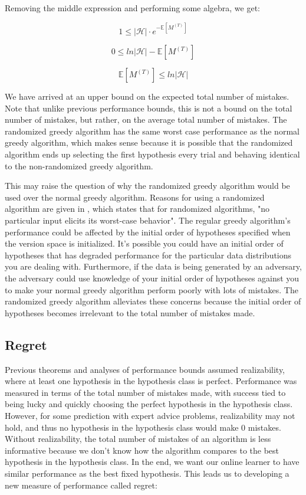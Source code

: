 \documentclass[11pt]{article}
\begin{document}
Removing the middle expression and performing some algebra, we get:

$$1 \leq |\mathcal{H}| \cdot e^{-\mathbb{E} [M^{(T)}]}$$

$$0 \leq ln |\mathcal{H}| -\mathbb{E} [M^{(T)}]$$

$$\mathbb{E} [M^{(T)}] \leq ln |\mathcal{H}|$$

We have arrived at an upper bound on the expected total number of mistakes. Note that unlike previous performance bounds, this is not a bound on the total number of mistakes, but rather, on the average total number of mistakes. The randomized greedy algorithm has the same worst case performance as the normal greedy algorithm, which makes sense because it is possible that the randomized algorithm ends up selecting the first hypothesis every trial and behaving identical to the non-randomized greedy algorithm. 

This may raise the question of why the randomized greedy algorithm would be used over the normal greedy algorithm. Reasons for using a randomized algorithm are given in \cite{cormen2009introduction}, which states that for randomized algorithms, "no particular input elicits its worst-case behavior". The regular greedy algorithm's performance could be affected by the initial order of hypotheses specified when the version space is initialized. It's possible you could have an initial order of hypotheses that has degraded performance for the particular data distributions you are dealing with. Furthermore, if the data is being generated by an adversary, the adversary could use knowledge of your initial order of hypotheses against you to make your normal greedy algorithm perform poorly with lots of mistakes. The randomized greedy algorithm alleviates these concerns because the initial order of hypotheses becomes irrelevant to the total number of mistakes made.

\subsection{Regret}

Previous theorems and analyses of performance bounds assumed realizability, where at least one hypothesis in the hypothesis class is perfect. Performance was measured in terms of the total number of mistakes made, with success tied to being lucky and quickly choosing the perfect hypothesis in the hypothesis class. However, for some prediction with expert advice problems, realizability may not hold, and thus no hypothesis in the hypothesis class would make 0 mistakes. Without realizability, the total number of mistakes of an algorithm is less informative because we don't know how the algorithm compares to the best hypothesis in the hypothesis class. In the end, we want our online learner to have similar performance as the best fixed hypothesis. This leads us to developing a new measure of performance called regret:
\end{document}
